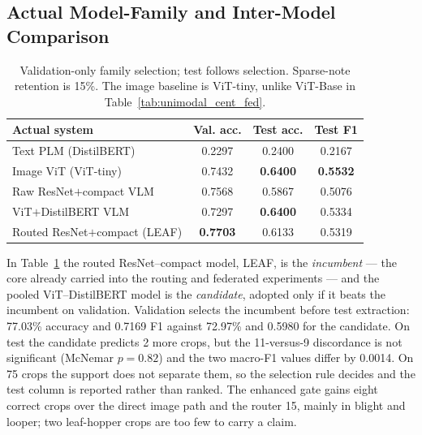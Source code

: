 \documentclass[conference]{IEEEtran}
\begin{document}
\subsection{Actual Model-Family and Inter-Model Comparison}







\begin{table}[t]
\caption{Validation-only family selection; test follows selection. Sparse-note retention is 15\%. The image baseline is ViT-tiny, unlike ViT-Base in Table~\ref{tab:unimodal_cent_fed}.}
\label{tab:family_comparison}
\centering\footnotesize
\setlength\tabcolsep{3.8pt}
\begin{tabular}{lccc}
\toprule
\textbf{Actual system} & \textbf{Val. acc.} & \textbf{Test acc.} & \textbf{Test F1}\\
\midrule
Text PLM (DistilBERT) & 0.2297 & 0.2400 & 0.2167\\
Image ViT (ViT-tiny) & 0.7432 & \textbf{0.6400} & \textbf{0.5532}\\
Raw ResNet$+$compact VLM & 0.7568 & 0.5867 & 0.5076\\
ViT$+$DistilBERT VLM & 0.7297 & \textbf{0.6400} & 0.5334\\
Routed ResNet$+$compact (LEAF) & \textbf{0.7703} & 0.6133 & 0.5319\\
\bottomrule
\end{tabular}
\end{table}



In Table~\ref{tab:family_comparison} the routed ResNet--compact model, LEAF, is the
\emph{incumbent} --- the core already carried into the routing and federated
experiments --- and the pooled ViT--DistilBERT model is the \emph{candidate},
adopted only if it beats the incumbent on validation. Validation selects the
incumbent before test extraction: 77.03\% accuracy and 0.7169 F1
against 72.97\% and 0.5980 for the candidate. On test the candidate
predicts 2 more crops, but the 11-versus-9 discordance is not
significant (McNemar $p=0.82$) and the two macro-F1 values differ by
0.0014. On 75 crops the support does not separate them, so the
selection rule decides and the test column is reported rather than ranked. The
enhanced gate gains eight correct crops over the direct image path and the
router 15, mainly in blight and looper; two leaf-hopper crops are too few to
carry a claim.
\end{document}
